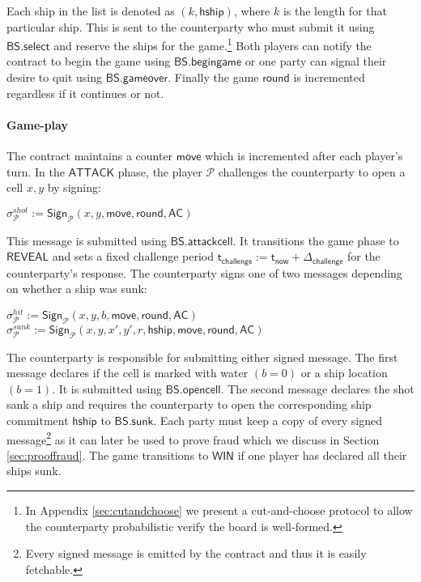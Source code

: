 \documentclass{llncs}
\newcommand{\gameattack}{\mathsf{ATTACK}}
\newcommand{\gamereveal}{\mathsf{REVEAL}}
\newcommand{\gamewinner}{\mathsf{WIN}}
\newcommand{\hship}{\mathsf{hship}}
\newcommand{\participant}{\mathcal{P}}
\newcommand{\sign}{\mathsf{Sign}}
\newcommand{\battleshipattackcell}{\mathsf{BS.attackcell}}
\newcommand{\battleshipbegin}{\mathsf{BS.begingame}}
\newcommand{\battleshipselectboard}{\mathsf{BS.select}}
\newcommand{\battleshiprevealcell}{\mathsf{BS.opencell}}
\newcommand{\battleshipsinking}{\mathsf{BS.sunk}}
\newcommand{\battleshipgameover}{\mathsf{BS.gameover}}
\newcommand{\appcontract}{\mathsf{AC}}
\newcommand{\timerchallenge}{\mathsf{\Delta}_{\mathsf{challenge}}}
\newcommand{\timechallenge}{\mathsf{t}_{\mathsf{challenge}}}
\newcommand{\timenow}{\mathsf{t}_{\mathsf{now}}}
\begin{document}
	Each ship in the list is denoted as $(k,\hship)$, where $k$ is the length for that particular ship.  
	This is sent to the counterparty who must submit it using $\battleshipselectboard$ and reserve the ships for the game.\footnote{In Appendix  \ref{sec:cutandchoose} we present a cut-and-choose protocol to allow the counterparty probabilistic verify the board is well-formed.}
	Both players can notify the contract to begin the game using $\battleshipbegin$ or one party can signal their desire to quit using $\battleshipgameover$.
	Finally the game $\mathsf{round}$ is incremented regardless if it continues or not. 
	
	\paragraph{Game-play} \label{sec:gameplayships}
	The contract maintains a counter $\mathsf{move}$ which is incremented after each player's turn. 
	In the $\gameattack$ phase, the player $\participant$ challenges the counterparty to open a cell $x,y$ by signing: 
	
	\begin{center}
		$\sigma^{shot}_{\participant} := \sign_{\participant}(x,y, \mathsf{move}, \mathsf{round},\appcontract)$ \\
	\end{center}
	
	This message is submitted using $\battleshipattackcell$.
	It transitions the game phase to $\gamereveal$ and sets a fixed challenge period $\timechallenge := \timenow + \timerchallenge$ for the counterparty's response. 
	The counterparty signs one of two messages depending on whether a ship was sunk:
	
	\begin{center}
		$\sigma^{hit}_{\participant} := \sign_{\participant}(x,y,b,\mathsf{move}, \mathsf{round},\appcontract)$ \\ $\sigma^{sunk}_{\participant} := \sign_{\participant}(x,y,x',y',r,\hship,\mathsf{move}, \mathsf{round},\appcontract)$
	\end{center}
	
	The counterparty is responsible for submitting either signed message. 
	The first message declares if the cell is marked with water $(b=0)$ or a ship location $(b=1)$.
	It is submitted using $\battleshiprevealcell$.
	The second message declares the shot sank a ship and requires the counterparty to open the corresponding ship commitment $\hship$ to $\battleshipsinking$. 
	Each party must keep a copy of every signed message\footnote{Every signed message is emitted by the contract and thus it is easily fetchable.} as it can later be used to prove fraud which we discuss in Section \ref{sec:prooffraud}.
	The game transitions to $\gamewinner$ if one player has declared all their ships sunk. 
	
\end{document}
